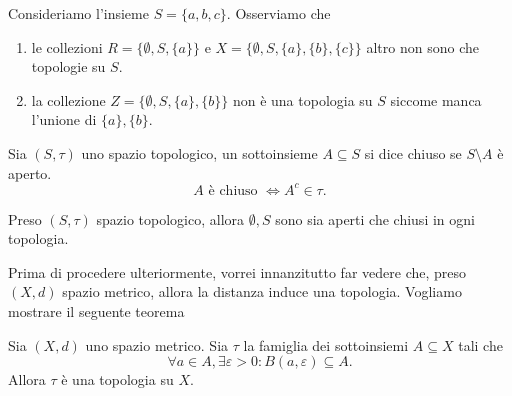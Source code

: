 \vspace{0.5cm}
\begin{example}
    Consideriamo l'insieme $S = \{a,b,c \}$. Osserviamo che
    \begin{enumerate}[label=\protect\circled{\arabic*}]
        \item le collezioni $R = \{\emptyset, S, \{a \} \}$ e $X = \{ \emptyset, S, \{a\}, \{b\}, \{c\} \}$ altro non sono che topologie su $S$.
        \item la collezione $Z = \{\emptyset, S, \{ a \}, \{ b \} \}$ non è una topologia su $S$ siccome manca l'unione di $\{ a \}, \{ b \}$.
    \end{enumerate}
\end{example}
%
\vspace{0.5cm}
\begin{definition}[\textcolor{blue}{insieme chiuso}]
    Sia $(S, \tau)$ uno spazio topologico, un sottoinsieme $A \subseteq S$ si dice chiuso se $S \setminus A$ è aperto.
    \begin{equation*}
        A \text{ è chiuso } \iff A^c \in \tau.
    \end{equation*}
\end{definition}
\begin{remark}
    Preso $(S, \tau)$ spazio topologico, allora $\emptyset, S$ sono sia aperti che chiusi in ogni topologia.
\end{remark}
%
Prima di procedere ulteriormente, vorrei innanzitutto far vedere che, preso $(X, d)$ spazio metrico, allora la distanza induce una topologia. Vogliamo mostrare il seguente teorema
%
\vspace{0.5cm}
\begin{theorem}[\textcolor{blue}{degli aperti metrici}]
    Sia $(X, d)$ uno spazio metrico. Sia $\tau$ la famiglia dei sottoinsiemi $A \subseteq X$ tali che
    $$
    \forall a \in A, \exists \varepsilon > 0 : B(a, \varepsilon) \subseteq A.
    $$
    Allora $\tau$ è una topologia su $X$.
\end{theorem}

